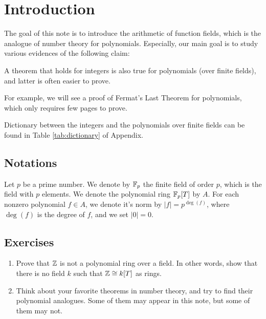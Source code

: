 \section{Introduction}
\label{sec:intro}

The goal of this note is to introduce the arithmetic of function fields, which is the analogue of number theory for polynomials.
Especially, our main goal is to study various evidences of the following claim:

\begin{myquote}
A theorem that holds for integers is also true for polynomials (over finite fields), and latter is often easier to prove.
\end{myquote}
For example, we will see a proof of Fermat's Last Theorem for polynomials, which only requires few pages to prove.

Dictionary between the integers and the polynomials over finite fields can be found in Table \ref{tab:dictionary} of Appendix.

\subsection*{Notations}

Let $p$ be a prime number. We denote by $\mathbb{F}_p$ the finite field of order $p$, which is the field with $p$ elements.
We denote the polynomial ring $\mathbb{F}_p[T]$ by $A$.
For each nonzero polynomial $f \in A$, we denote it's norm by $|f| = p^{\deg (f)}$, where $\deg (f)$ is the degree of $f$, and we set $|0| = 0$.


\subsection*{Exercises}
\begin{enumerate}
    \item Prove that $\mathbb{Z}$ is not a polynomial ring over a field. In other words, show that there is no field $k$ such that $\mathbb{Z} \cong k[T]$ as rings.
    \item Think about your favorite theorems in number theory, and try to find their polynomial analogues. Some of them may appear in this note, but some of them may not.
\end{enumerate}